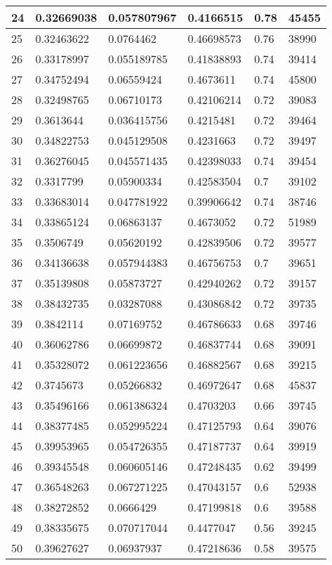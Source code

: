 \begin{longtable}{|l|l|l|l|l|l|}
24 & 0.32669038 & 0.057807967 & 0.4166515 & 0.78 & 45455 \\ \hline 
25 & 0.32463622 & 0.0764462 & 0.46698573 & 0.76 & 38990 \\ \hline 
26 & 0.33178997 & 0.055189785 & 0.41838893 & 0.74 & 39414 \\ \hline 
27 & 0.34752494 & 0.06559424 & 0.4673611 & 0.74 & 45800 \\ \hline 
28 & 0.32498765 & 0.06710173 & 0.42106214 & 0.72 & 39083 \\ \hline 
29 & 0.3613644 & 0.036415756 & 0.4215481 & 0.72 & 39464 \\ \hline 
30 & 0.34822753 & 0.045129508 & 0.4231663 & 0.72 & 39497 \\ \hline 
31 & 0.36276045 & 0.045571435 & 0.42398033 & 0.74 & 39454 \\ \hline 
32 & 0.3317799 & 0.05900334 & 0.42583504 & 0.7 & 39102 \\ \hline 
33 & 0.33683014 & 0.047781922 & 0.39906642 & 0.74 & 38746 \\ \hline 
34 & 0.33865124 & 0.06863137 & 0.4673052 & 0.72 & 51989 \\ \hline 
35 & 0.3506749 & 0.05620192 & 0.42839506 & 0.72 & 39577 \\ \hline 
36 & 0.34136638 & 0.057944383 & 0.46756753 & 0.7 & 39651 \\ \hline 
37 & 0.35139808 & 0.05873727 & 0.42940262 & 0.72 & 39157 \\ \hline 
38 & 0.38432735 & 0.03287088 & 0.43086842 & 0.72 & 39735 \\ \hline 
39 & 0.3842114 & 0.07169752 & 0.46786633 & 0.68 & 39746 \\ \hline 
40 & 0.36062786 & 0.06699872 & 0.46837744 & 0.68 & 39091 \\ \hline 
41 & 0.35328072 & 0.061223656 & 0.46882567 & 0.68 & 39215 \\ \hline 
42 & 0.3745673 & 0.05266832 & 0.46972647 & 0.68 & 45837 \\ \hline 
43 & 0.35496166 & 0.061386324 & 0.4703203 & 0.66 & 39745 \\ \hline 
44 & 0.38377485 & 0.052995224 & 0.47125793 & 0.64 & 39076 \\ \hline 
45 & 0.39953965 & 0.054726355 & 0.47187737 & 0.64 & 39919 \\ \hline 
46 & 0.39345548 & 0.060605146 & 0.47248435 & 0.62 & 39499 \\ \hline 
47 & 0.36548263 & 0.067271225 & 0.47043157 & 0.6 & 52938 \\ \hline 
48 & 0.38272852 & 0.0666429 & 0.47199818 & 0.6 & 39588 \\ \hline 
49 & 0.38335675 & 0.070717044 & 0.4477047 & 0.56 & 39245 \\ \hline 
50 & 0.39627627 & 0.06937937 & 0.47218636 & 0.58 & 39575 \\ \hline 
\end{longtable}